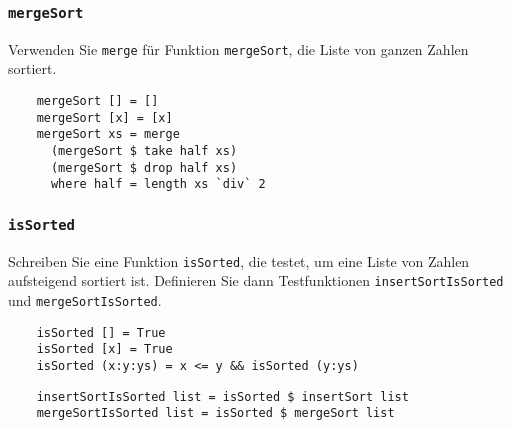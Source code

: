 \documentclass{beamer}
\begin{document}
\begin{frame}[fragile]
  \frametitle{\lstinline{mergeSort}}
  Verwenden Sie \lstinline{merge} für Funktion \lstinline{mergeSort}, die Liste von ganzen Zahlen sortiert.
  \pause
  \begin{lstlisting}
    mergeSort [] = []
    mergeSort [x] = [x]
    mergeSort xs = merge
      (mergeSort $ take half xs)
      (mergeSort $ drop half xs)
      where half = length xs `div` 2
  \end{lstlisting}
\end{frame}

\begin{frame}[fragile]
  \frametitle{\lstinline{isSorted}}
  Schreiben Sie eine Funktion \lstinline{isSorted}, die testet, um eine Liste von Zahlen aufsteigend sortiert ist.
  Definieren Sie dann Testfunktionen \lstinline{insertSortIsSorted} und \lstinline{mergeSortIsSorted}.
  \pause
  \begin{lstlisting}
    isSorted [] = True
    isSorted [x] = True
    isSorted (x:y:ys) = x <= y && isSorted (y:ys)
  \end{lstlisting}
  \pause
  \begin{lstlisting}
    insertSortIsSorted list = isSorted $ insertSort list
    mergeSortIsSorted list = isSorted $ mergeSort list
  \end{lstlisting}
\end{frame}
\end{document}
